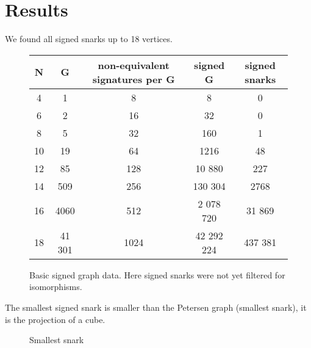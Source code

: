 \chapter{Results}

We found all signed snarks up to 18 vertices.

\todo{}

\begin{figure}[h]
    \centering
    \begin{tabular}{ |c|c|c|c|c| }
        \hline
        N & G & non-equivalent signatures per G & signed G & signed snarks \\
        \hline
        \hline
        4 & 1 & 8 & 8 & 0 \\
        \hline
        6 & 2 & 16 & 32 & 0 \\
        \hline
        8 & 5 & 32 & 160 & 1 \\
        \hline
        10 & 19 & 64 & 1216 & 48 \\
        \hline
        12 & 85 & 128 & 10 880 & 227 \\
        \hline
        14 & 509 & 256 & 130 304 & 2768 \\
        \hline
        16 & 4060 & 512 & 2 078 720 & 31 869 \\
        \hline
        18 & 41 301 & 1024 & 42 292 224 & 437 381 \\
        \hline
    \end{tabular}
    \caption[Basic signed graph data]{Basic signed graph data. Here signed snarks were not yet filtered for isomorphisms.}
\end{figure}

The smallest signed snark is smaller than the Petersen graph (smallest snark), it is the projection of a cube.

\begin{figure}[h]
    \centering
    \caption{Smallest snark}
\end{figure}

